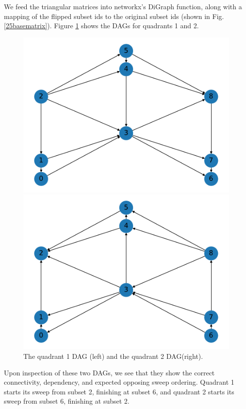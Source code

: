 We feed the triangular matrices into networkx's DiGraph function, along with a mapping of the flipped subset ids to the original subset ids (shown in Fig. \ref{25basematrix}). Figure \ref{25_q1q2graphs} shows the DAGs for quadrants 1 and 2.
\begin{figure}[H]
\begin{minipage}[c]{0.5\textwidth}
\includegraphics[scale=0.5]{../../figures/9_graph1.pdf}
\end{minipage}
\begin{minipage}[c]{0.5\textwidth}
\includegraphics[scale=0.5]{../../figures/9_graph2.pdf}
\end{minipage}
\caption{The quadrant 1 DAG (left) and the quadrant 2 DAG(right).}
\label{25_q1q2graphs}
\end{figure}
Upon inspection of these two DAGs, we see that they show the correct connectivity, dependency, and expected opposing sweep ordering. 
Quadrant 1 starts its sweep from subset 2, finishing at subset 6, and quadrant 2 starts its sweep from subset 6, finishing at subset 2.

